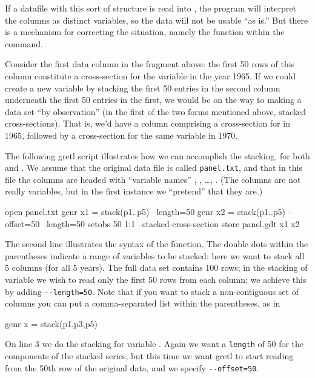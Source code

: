 If a datafile with this sort of structure is read into ,
the program will interpret the columns as distinct variables, so the
data will not be usable ``as is.''  But there is a mechanism for
correcting the situation, namely the  function within
the  command.

Consider the first data column in the fragment above: the first 50 rows
of this column constitute a cross-section for the variable 
in the year 1965.  If we could create a new variable by stacking the
first 50 entries in the second column underneath the first 50 entries
in the first, we would be on the way to making a data set ``by
observation'' (in the first of the two forms mentioned above, stacked
cross-sections).  That is, we'd have a column comprising a
cross-section for  in 1965, followed by a cross-section for
the same variable in 1970.

The following gretl script illustrates how we can accomplish the
stacking, for both  and .  We assume
that the original data file is called \texttt{panel.txt}, and that in
this file the columns are headed with ``variable names'' ,
, \dots, .  (The columns are not really
variables, but in the first instance we ``pretend'' that they are.)

\begin{code}
    open panel.txt
    genr x1 = stack(p1..p5) --length=50
    genr x2 = stack(p1..p5) --offset=50 --length=50
    setobs 50 1:1 --stacked-cross-section
    store panel.gdt x1 x2
\end{code}

The second line illustrates the syntax of the  function.
The double dots within the parentheses indicate a range of variables
to be stacked: here we want to stack all 5 columns (for all 5 years).
The full data set contains 100 rows; in the stacking of variable
 we wish to read only the first 50 rows from each column:
we achieve this by adding \verb+--length=50+.  Note that if you want
to stack a non-contiguous set of columns you can put a comma-separated
list within the parentheses, as in

\begin{code}
    genr x = stack(p1,p3,p5)
\end{code}

On line 3 we do the stacking for variable .  Again we want
a \texttt{length} of 50 for the components of the stacked series, but
this time we want gretl to start reading from the 50th row of the
original data, and we specify \verb+--offset=50+.

